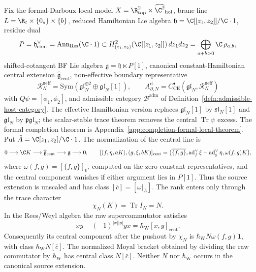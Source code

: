 \begin{defn}\label{defn:six-boundary-open-closed-objects}
Fix the formal-Darboux local model
\(X=\R^2_{\mathrm{top}}\times\widehat{\C^2}_{\mathrm{hol}}\),
brane line \(L=\R_t\times\{0_s\}\times\{b\}\), reduced Hamiltonian Lie algebra
\(\mathfrak h=\C[[z_1,z_2]]/\C\cdot 1\), residue dual
\[
  P=\mathfrak h^\vee_{\mathrm{cont}}
  =\operatorname{Ann}_{\operatorname{Res}}(\C\cdot1)
  \subset H^2_{(z_1,z_2)}(\C[[z_1,z_2]])\,dz_1dz_2
  =\bigoplus_{a+b>0}\C\,\rho_{a,b},
\]
shifted-cotangent BF Lie
algebra \(\mathfrak g=\mathfrak h\ltimes P[1]\), canonical
constant-Hamiltonian central extension
\(\widehat{\mathfrak g}_{\mathrm{cent}}\), non-effective boundary
representative
\[
  \mathcal R_N^{\mathrm{neff}}
  =
  \mathrm{Sym}(\mathfrak{gl}_N^{\oplus2}\oplus\mathfrak{gl}_N[1]),
  \qquad
  A^{\mathrm{cl}}_{\partial,N}=
  C^\bullet_{\mathrm{CE}}(\mathfrak{gl}_N,\mathcal R_N^{\mathrm{neff}})
\]
with \(Q\psi=[\phi_1,\phi_2]\), and admissible category
\(\mathcal B^{\mathrm{adm}}\) of
Definition~\ref{defn:admissible-host-category}.  The effective Hamiltonian
version replaces \(\mathfrak{gl}_N[1]\) by \(\mathfrak{sl}_N[1]\) and
\(\mathfrak{gl}_N\) by \(\mathfrak{pgl}_N\); the scalar-stable trace theorem
removes the central \(\operatorname{Tr}\psi\) excess.  The formal completion
theorem is Appendix~\ref{app:completion-formal-local-theorem}.  Put
\(\bar A=\C[z_1,z_2]/\C\cdot1\).
The normalization of the central line is
\[
  0\longrightarrow\C K\longrightarrow
  \widehat{\mathfrak g}_{\mathrm{cent}}
  \longrightarrow\mathfrak g\longrightarrow0,
  \qquad
  [(f,\eta,aK),(g,\xi,bK)]_{\mathrm{cent}}
  =
  \bigl(\overline{\{f,g\}},\operatorname{ad}^{\vee}_f\xi
  -\operatorname{ad}^{\vee}_g\eta,\omega(f,g)K\bigr),
\]
where
\(\omega(f,g)=[\{f,g\}]_0\), computed on the zero-constant
representatives, and the central component vanishes if either argument
lies in \(P[1]\).  Thus the source extension is unscaled and has class
\([\bar c]=[\omega|_{\bar A}]\).  The rank enters only through the trace
character
\[
  \chi_N(K)=\operatorname{Tr}I_N=N.
\]
In the Rees/Weyl algebra the raw supercommutator satisfies
\[
  xy-(-1)^{|x||y|}yx
  =\hbar_{\mathrm W}[x,y]_{\mathrm{cent}}.
\]
Consequently its central component after the pushout by \(\chi_N\) is
\(\hbar_{\mathrm W}N\omega(f,g)\mathbf1\), with class
\(\hbar_{\mathrm W}N[\bar c]\).  The normalized Moyal bracket obtained
by dividing the raw commutator by \(\hbar_{\mathrm W}\) has central
class \(N[\bar c]\).  Neither \(N\) nor \(\hbar_{\mathrm W}\) occurs in
the canonical source extension.


\end{defn}
